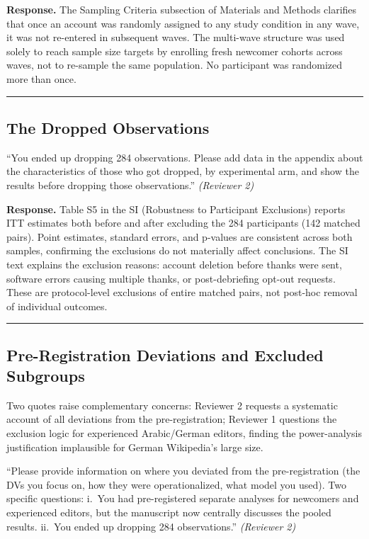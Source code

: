 \documentclass[12pt]{article}
\newenvironment{reviewquote}{%
  \def\FrameCommand{{\color{quotebarcolor}\vrule width 2pt}\colorbox{quotebg}}%
  \MakeFramed{\advance\hsize-\width \FrameRestore}%
  \small
}{%
  \endMakeFramed
}
\newcommand{\sectionnote}[1]{\par\smallskip#1\par\medskip}
\begin{document}
\textbf{Response.} The Sampling Criteria subsection of Materials and Methods clarifies that once an account was randomly assigned to any study condition in any wave, it was not re-entered in subsequent waves. The multi-wave structure was used solely to reach sample size targets by enrolling fresh newcomer cohorts across waves, not to re-sample the same population. No participant was randomized more than once.

\bigskip\hrule\bigskip

\subsection{The Dropped Observations}

\begin{reviewquote}
``You ended up dropping 284 observations. Please add data in the appendix about the characteristics of those who got dropped, by experimental arm, and show the results before dropping those observations.'' \textit{(Reviewer 2)}
\end{reviewquote}

\textbf{Response.} Table S5 in the SI (Robustness to Participant Exclusions) reports ITT estimates both before and after excluding the 284 participants (142 matched pairs). Point estimates, standard errors, and p-values are consistent across both samples, confirming the exclusions do not materially affect conclusions. The SI text explains the exclusion reasons: account deletion before thanks were sent, software errors causing multiple thanks, or post-debriefing opt-out requests. These are protocol-level exclusions of entire matched pairs, not post-hoc removal of individual outcomes.

\bigskip\hrule\bigskip

\subsection{Pre-Registration Deviations and Excluded Subgroups}

\sectionnote{Two quotes raise complementary concerns: Reviewer 2 requests a systematic account of all deviations from the pre-registration; Reviewer 1 questions the exclusion logic for experienced Arabic/German editors, finding the power-analysis justification implausible for German Wikipedia's large size.}

\begin{reviewquote}
``Please provide information on where you deviated from the pre-registration (the DVs you focus on, how they were operationalized, what model you used). Two specific questions: i.\ You had pre-registered separate analyses for newcomers and experienced editors, but the manuscript now centrally discusses the pooled results. ii.\ You ended up dropping 284 observations.'' \textit{(Reviewer 2)}
\end{reviewquote}
\end{document}
